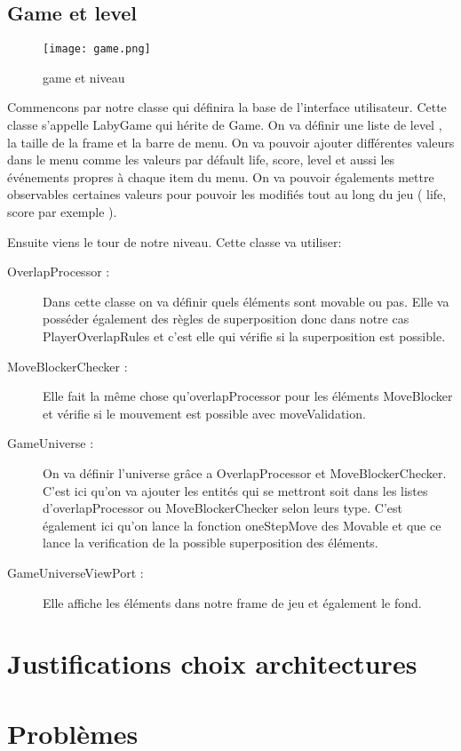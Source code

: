\documentclass{article}
\begin{document}
\subsection{Game et level}

\begin{figure}[!h]
\centering
\texttt{[image: game.png]}
\caption[Entitées]{game et niveau}
\end{figure}

Commencons par notre classe qui définira la base de l'interface utilisateur. Cette classe s'appelle LabyGame qui hérite de Game. On va définir une liste de level , la taille de la frame et la barre de menu. On va pouvoir ajouter différentes valeurs dans le menu comme les valeurs par défault life, score, level et aussi les événements propres à chaque item du menu. On va pouvoir égalements mettre observables certaines valeurs pour pouvoir les modifiés tout au long du jeu ( life, score par exemple ). 

Ensuite viens le tour de notre niveau. Cette classe va utiliser:
\begin{description}
\item[OverlapProcessor :] Dans cette classe on va définir quels éléments sont movable ou pas. Elle va posséder également des règles de superposition donc dans notre cas PlayerOverlapRules et c'est elle qui vérifie si la superposition est possible.
\item[MoveBlockerChecker :] Elle fait la même chose qu'overlapProcessor pour les éléments MoveBlocker et vérifie si le mouvement est possible avec moveValidation.
\item[GameUniverse :] On va définir l'universe grâce a OverlapProcessor et MoveBlockerChecker. C'est ici qu'on va ajouter les entités qui se mettront soit dans les listes d'overlapProcessor ou MoveBlockerChecker selon leurs type. C'est également ici qu'on lance la fonction oneStepMove des Movable et que ce lance la verification de la possible superposition des éléments.
\item[GameUniverseViewPort :] Elle affiche les éléments dans notre frame de jeu et également le fond.
\end{description}


\section{Justifications choix architectures}

\section{Problèmes}
\end{document}
